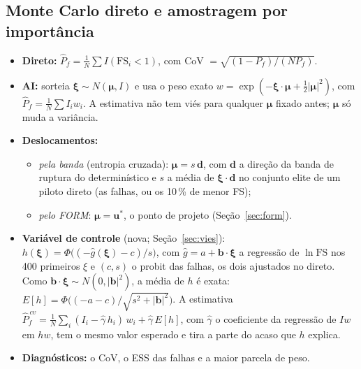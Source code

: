 \documentclass[11pt,a4paper]{article}
\begin{document}
\subsection{Monte Carlo direto e amostragem por importância}
\begin{itemize}
  \item \textbf{Direto:} $\hat P_f = \frac1N\sum I(\mathrm{FS}_i < 1)$, com CoV $= \sqrt{(1-P_f)/(N P_f)}$.
  \item \textbf{AI:} sorteia $\bm\xi \sim N(\bm\mu, I)$ e usa o peso exato
    $w = \exp(-\bm\xi\cdot\bm\mu + \tfrac12|\bm\mu|^2)$, com $\hat P_f = \frac1N \sum I_i w_i$. A estimativa não tem viés
    para qualquer $\bm\mu$ fixado antes; $\bm\mu$ só muda a variância.
  \item \textbf{Deslocamentos:}
    \begin{itemize}
      \item \emph{pela banda} (entropia cruzada): $\bm\mu = s\,\bm d$, com $\bm d$ a direção da banda de ruptura do
        determinístico e $s$ a média de $\bm\xi\cdot\bm d$ no conjunto elite de um piloto direto (as falhas, ou os 10\,\%
        de menor FS);
      \item \emph{pelo FORM}: $\bm\mu = \bm u^*$, o ponto de projeto (Seção~\ref{sec:form}).
    \end{itemize}
  \item \textbf{Variável de controle} (nova; Seção~\ref{sec:vies}): $h(\bm\xi) = \Phi\big((-\hat g(\bm\xi) - c)/s\big)$,
    com $\hat g = a + \bm b\cdot\bm\xi$ a regressão de $\ln\mathrm{FS}$ nos 400 primeiros $\xi$ e $(c, s)$ o probit das
    falhas, os dois ajustados no direto. Como $\bm b\cdot\bm\xi \sim N(0, |\bm b|^2)$, a média de $h$ é exata:
    $E[h] = \Phi\big((-a - c)/\sqrt{s^2 + |\bm b|^2}\big)$. A estimativa
    $\hat P_f^{\,cv} = \frac1N\sum_i (I_i - \hat\gamma\, h_i)\, w_i + \hat\gamma\, E[h]$, com $\hat\gamma$ o coeficiente
    da regressão de $I w$ em $h w$, tem o mesmo valor esperado e tira a parte do acaso que $h$ explica.
  \item \textbf{Diagnósticos:} o CoV, o ESS das falhas e a maior parcela de peso.
\end{itemize}
\end{document}
